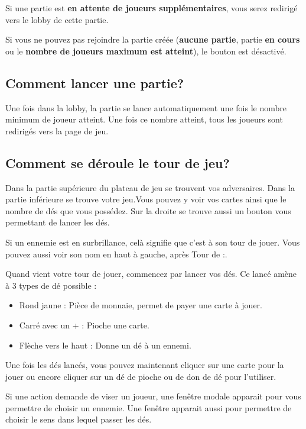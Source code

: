 \documentclass[11pt]{scrreprt}
\begin{document}
    Si une partie est \textbf{en attente de joueurs supplémentaires}, vous serez redirigé vers le lobby de cette partie.

    Si vous ne pouvez pas rejoindre la partie créée (\textbf{aucune partie}, partie \textbf{en cours} ou le \textbf{nombre de joueurs maximum est atteint}), le bouton est désactivé.

    \subsection{Comment lancer une partie?}
    Une fois dans la lobby, la partie se lance automatiquement une fois le nombre minimum de joueur atteint. Une fois ce nombre atteint, tous les joueurs sont redirigés vers la page de jeu.

    \subsection{Comment se déroule le tour de jeu?}
    Dans la partie supérieure du plateau de jeu se trouvent vos adversaires. Dans la partie inférieure se trouve votre jeu.Vous pouvez y voir vos cartes ainsi que le nombre de dés que vous possédez. Sur la droite se trouve aussi un bouton vous permettant de lancer les dés.

    Si un ennemie est en surbrillance, celà signifie que c'est à son tour de jouer. Vous pouvez aussi voir son nom en haut à gauche, après \og Tour de :\fg{}.

    Quand vient votre tour de jouer, commencez par lancer vos dés. Ce lancé amène à 3 types de dé possible :

    \begin{itemize}
        \item Rond jaune : Pièce de monnaie, permet de payer une carte à jouer.
        \item Carré avec un + : Pioche une carte.
        \item Flèche vers le haut : Donne un dé à un ennemi.
    \end{itemize}

    Une fois les dés lancés, vous pouvez maintenant cliquer sur une carte pour la jouer ou encore cliquer sur un dé de pioche ou de don de dé pour l'utiliser.

    Si une action demande de viser un joueur, une fenêtre modale apparait pour vous permettre de choisir un ennemie. Une fenêtre apparait aussi pour permettre de choisir le sens dans lequel passer les dés.
\end{document}
